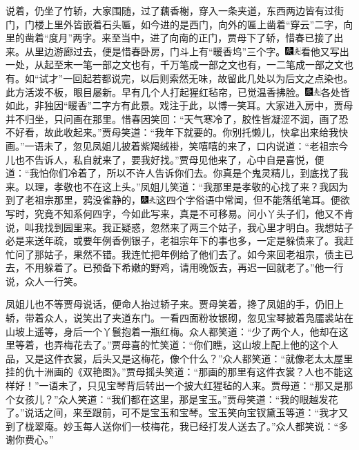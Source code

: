 说着，仍坐了竹轿，大家围随，过了藕香榭，穿入一条夹道，东西两边皆有过街门，门楼上里外皆嵌着石头匾，如今进的是西门，向外的匾上凿着``穿云''二字，向里的凿着``度月''两字。来至当中，进了向南的正门，贾母下了轿，惜春已接了出来。从里边游廊过去，便是惜春卧房，门斗上有``暖香坞''三个字。{\includegraphics[width=3mm]{../Images/00004}\includegraphics[width=3mm]{../Images/00012}\footnotesize \kaishu 看他又写出一处，从起至末一笔一部之文也有，千万笔成一部之文也有，一二笔成一部之文也有。如``试才''一回起若都说完，以后则索然无味，故留此几处以为后文之点染也。此方活泼不板，眼目屡新。}早有几个人打起猩红毡帘，已觉温香拂脸。{\includegraphics[width=3mm]{../Images/00004}\includegraphics[width=3mm]{../Images/00012}\footnotesize \kaishu 各处皆如此，非独因``暖香''二字方有此景。戏注于此，以博一笑耳。}大家进入房中，贾母并不归坐，只问画在那里。惜春因笑回：``天气寒冷了，胶性皆凝涩不润，画了恐不好看，故此收起来。''贾母笑道：``我年下就要的。你别托懒儿，快拿出来给我快画。''一语未了，忽见凤姐儿披着紫羯绒褂，笑嘻嘻的来了，口内说道：``老祖宗今儿也不告诉人，私自就来了，要我好找。''贾母见他来了，心中自是喜悦，便道：``我怕你们冷着了，所以不许人告诉你们去。你真是个鬼灵精儿，到底找了我来。以理，孝敬也不在这上头。''凤姐儿笑道：``我那里是孝敬的心找了来？我因为到了老祖宗那里，鸦没雀静的，{\includegraphics[width=3mm]{../Images/00004}\includegraphics[width=3mm]{../Images/00012}\footnotesize \kaishu 这四个字俗语中常闻，但不能落纸笔耳。便欲写时，究竟不知系何四字，今如此写来，真是不可移易。}问小丫头子们，他又不肯说，叫我找到园里来。我正疑惑，忽然来了两三个姑子，我心里才明白。我想姑子必是来送年疏，或要年例香例银子，老祖宗年下的事也多，一定是躲债来了。我赶忙问了那姑子，果然不错。我连忙把年例给了他们去了。如今来回老祖宗，债主已去，不用躲着了。已预备下希嫩的野鸡，请用晚饭去，再迟一回就老了。''他一行说，众人一行笑。

凤姐儿也不等贾母说话，便命人抬过轿子来。贾母笑着，搀了凤姐的手，仍旧上轿，带着众人，说笑出了夹道东门。一看四面粉妆银砌，忽见宝琴披着凫靥裘站在山坡上遥等，身后一个丫鬟抱着一瓶红梅。众人都笑道：``少了两个人，他却在这里等着，也弄梅花去了。''贾母喜的忙笑道：``你们瞧，这山坡上配上他的这个人品，又是这件衣裳，后头又是这梅花，像个什么？''众人都笑道：``就像老太太屋里挂的仇十洲画的《双艳图》。''贾母摇头笑道：``那画的那里有这件衣裳？人也不能这样好！''一语未了，只见宝琴背后转出一个披大红猩毡的人来。贾母道：``那又是那个女孩儿？''众人笑道：``我们都在这里，那是宝玉。''贾母笑道：``我的眼越发花了。''说话之间，来至跟前，可不是宝玉和宝琴。宝玉笑向宝钗黛玉等道：``我才又到了栊翠庵。妙玉每人送你们一枝梅花，我已经打发人送去了。''众人都笑说：``多谢你费心。''

